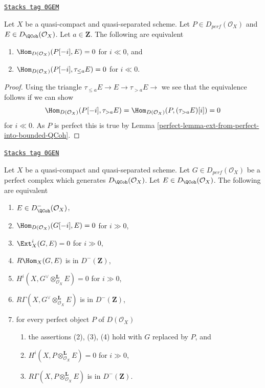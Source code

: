 \begin{lemma}
\label{perfect-lemma-bounded-below-truncation}
\href{https://stacks.math.columbia.edu/tag/0GEM}{\texttt{Stacks tag 0GEM}}

Let $X$ be a quasi-compact and quasi-separated scheme. Let
$P \in D_{perf}(\mathcal{O}_X)$ and $E \in D_{\QCoh}(\mathcal{O}_X)$.
Let $a \in \mathbf{Z}$. The following are equivalent
\begin{enumerate}
\item $\Hom_{D(\mathcal{O}_X)}(P[-i], E) = 0$ for $i \ll 0$, and
\item $\Hom_{D(\mathcal{O}_X)}(P[-i], \tau_{\leq a} E) = 0$ for $i \ll 0$.
\end{enumerate}
\end{lemma}

\begin{proof}

Using the triangle $ \tau_{\leq a} E \to E \to \tau_{> a} E \to$
we see that the equivalence follows if we can show
$$
\Hom_{D(\mathcal{O}_X)}(P[-i], \tau_{> a} E) =
\Hom_{D(\mathcal{O}_X)}(P, (\tau_{> a} E)[i]) = 0
$$
for $i \ll 0$. As $P$ is perfect this is true by
Lemma \ref{perfect-lemma-ext-from-perfect-into-bounded-QCoh}.
\end{proof}

\begin{proposition}
\label{perfect-proposition-detecting-bounded-above}
\href{https://stacks.math.columbia.edu/tag/0GEN}{\texttt{Stacks tag 0GEN}}

Let $X$ be a quasi-compact and quasi-separated scheme. Let
$G \in D_{perf}(\mathcal{O}_X)$ be a perfect complex which generates
$D_\QCoh (\mathcal{O}_X)$. Let $E \in D_\QCoh (\mathcal{O}_X)$.
The following are equivalent
\begin{enumerate}
\item $E \in D^-_\QCoh (\mathcal{O}_X)$,
\item $\Hom_{D(\mathcal{O}_X)}(G[-i], E) = 0$ for $i \gg 0$,
\item $\Ext^i_X(G, E) = 0$ for $i \gg 0$,
\item $R\Hom_X(G, E)$ is in $D^-(\mathbf{Z})$,
\item $H^i(X, G^\vee \otimes_{\mathcal{O}_X}^\mathbf{L} E) = 0$
for $i \gg 0$,
\item $R\Gamma(X, G^\vee \otimes_{\mathcal{O}_X}^\mathbf{L} E)$
is in $D^-(\mathbf{Z})$,
\item for every perfect object $P$ of $D(\mathcal{O}_X)$
\begin{enumerate}
\item the assertions (2), (3), (4) hold with $G$ replaced by $P$, and
\item $H^i(X, P \otimes_{\mathcal{O}_X}^\mathbf{L} E) = 0$ for $i \gg 0$,
\item $R\Gamma(X, P \otimes_{\mathcal{O}_X}^\mathbf{L} E)$
is in $D^-(\mathbf{Z})$.
\end{enumerate}
\end{enumerate}
\end{proposition}

